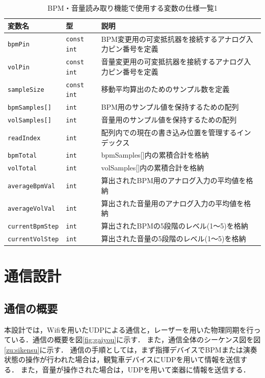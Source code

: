 \documentclass[lualatex,book,paper=a4paper,jafontsize=11.5pt,jafontscale=1.05]{jlreq}
\begin{document}
\begin{table}[H]
  \centering
  \caption{BPM・音量読み取り機能で使用する変数の仕様一覧1}
  \label{tab:bpmvol1}
  \begin{tabular}{llp{6cm}} \hline
    変数名 & 型 & 説明 \\ \hline
	  \texttt{bpmPin} & \texttt{const int} & BPM変更用の可変抵抗器を接続するアナログ入力ピン番号を定義 \\\hline
	  \texttt{volPin} & \texttt{const int} & 音量変更用の可変抵抗器を接続するアナログ入力ピン番号を定義 \\\hline
    \texttt{sampleSize} & \texttt{const int}  & 移動平均算出のためのサンプル数を定義 \\\hline
	  \texttt{bpmSamples[]} & \texttt{int}  & BPM用のサンプル値を保持するための配列 \\\hline
	  \texttt{volSamples[]} & \texttt{int}  & 音量用のサンプル値を保持するための配列 \\\hline
	  \texttt{readIndex} & \texttt{int}  & 配列内での現在の書き込み位置を管理するインデックス \\\hline
	  \texttt{bpmTotal} & \texttt{int}  & bpmSamples[]内の累積合計を格納 \\ \hline
	  \texttt{volTotal} & \texttt{int}  & volSamples[]内の累積合計を格納 \\ \hline
    \texttt{averageBpmVal} & \texttt{int}  & 算出されたBPM用のアナログ入力の平均値を格納\\ \hline
    \texttt{averageVolVal} & \texttt{int}  & 算出された音量用のアナログ入力の平均値を格納 \\ \hline
	  \texttt{currentBpmStep} & \texttt{int}  & 算出されたBPMの5段階のレベル(1〜5)を格納\\ \hline
	  \texttt{currentVolStep} & \texttt{int}  & 算出された音量の5段階のレベル(1〜5)を格納 \\ \hline
\end{tabular}
\end{table}



\section{通信設計}
\subsection{通信の概要}
本設計では，Wifiを用いたUDPによる通信と，レーザーを用いた物理同期を行っている．通信の概要を図\ref{fig:gaiyou}に示す．
また，通信全体のシーケンス図を図\ref{zu:sikensu}に示す．
通信の手順としては，まず指揮デバイスでBPMまたは演奏状態の操作が行われた場合は，観覧車デバイスにUDPを用いて情報を送信する．
また，音量が操作された場合は，UDPを用いて楽器に情報を送信する．
\end{document}
